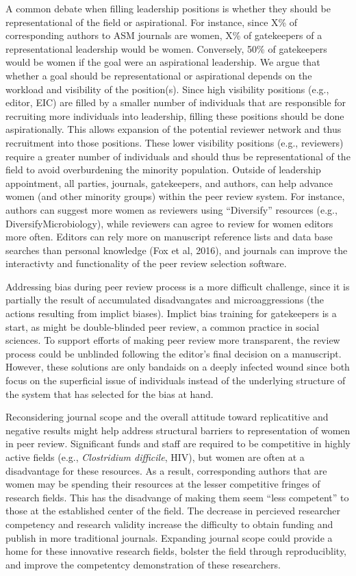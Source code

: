 \documentclass[11pt,]{article}
\begin{document}
A common debate when filling leadership positions is whether they should
be representational of the field or aspirational. For instance, since
X\% of corresponding authors to ASM journals are women, X\% of
gatekeepers of a representational leadership would be women. Conversely,
50\% of gatekeepers would be women if the goal were an aspirational
leadership. We argue that whether a goal should be representational or
aspirational depends on the workload and visibility of the position(s).
Since high visibility positions (e.g., editor, EIC) are filled by a
smaller number of individuals that are responsible for recruiting more
individuals into leadership, filling these positions should be done
aspirationally. This allows expansion of the potential reviewer network
and thus recruitment into those positions. These lower visibility
positions (e.g., reviewers) require a greater number of individuals and
should thus be representational of the field to avoid overburdening the
minority population. Outside of leadership appointment, all parties,
journals, gatekeepers, and authors, can help advance women (and other
minority groups) within the peer review system. For instance, authors
can suggest more women as reviewers using ``Diversify'' resources (e.g.,
DiversifyMicrobiology), while reviewers can agree to review for women
editors more often. Editors can rely more on manuscript reference lists
and data base searches than personal knowledge (Fox et al, 2016), and
journals can improve the interactivty and functionality of the peer
review selection software.

Addressing bias during peer review process is a more difficult
challenge, since it is partially the result of accumulated disadvangates
and microaggressions (the actions resulting from implict biases).
Implict bias training for gatekeepers is a start, as might be
double-blinded peer review, a common practice in social sciences. To
support efforts of making peer review more transparent, the review
process could be unblinded following the editor's final decision on a
manuscript. However, these solutions are only bandaids on a deeply
infected wound since both focus on the superficial issue of individuals
instead of the underlying structure of the system that has selected for
the bias at hand.

Reconsidering journal scope and the overall attitude toward
replicatitive and negative results might help address structural
barriers to representation of women in peer review. Significant funds
and staff are required to be competitive in highly active fields (e.g.,
\emph{Clostridium difficile}, HIV), but women are often at a
disadvantage for these resources. As a result, corresponding authors
that are women may be spending their resources at the lesser competitive
fringes of research fields. This has the disadvange of making them seem
``less competent'' to those at the established center of the field. The
decrease in percieved researcher competency and research validity
increase the difficulty to obtain funding and publish in more
traditional journals. Expanding journal scope could provide a home for
these innovative research fields, bolster the field through
reproduciblity, and improve the competentcy demonstration of these
researchers.
\end{document}
